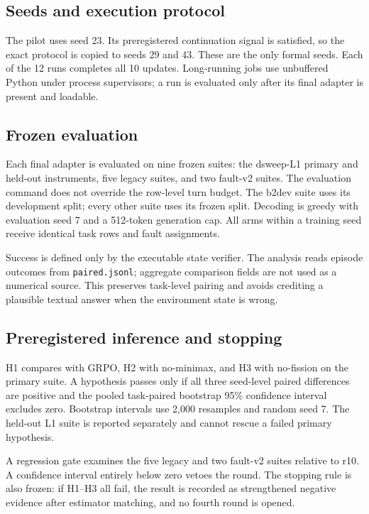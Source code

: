 \subsection{Seeds and execution protocol}

The pilot uses seed 23.  Its preregistered continuation signal is satisfied,
so the exact protocol is copied to seeds 29 and 43.  These are the only formal
seeds.  Each of the 12 runs completes all 10 updates.  Long-running jobs use
unbuffered Python under process supervisors; a run is evaluated only after
its final adapter is present and loadable.

\subsection{Frozen evaluation}

Each final adapter is evaluated on nine frozen suites: the dsweep-L1 primary
and held-out instruments, five legacy suites, and two fault-v2 suites.  The
evaluation command does not override the row-level turn budget.  The b2dev
suite uses its development split; every other suite uses its frozen split.
Decoding is greedy with evaluation seed 7 and a 512-token generation cap.
All arms within a training seed receive identical task rows and fault
assignments.

Success is defined only by the executable state verifier.  The analysis reads
episode outcomes from \texttt{paired.jsonl}; aggregate comparison fields are
not used as a numerical source.  This preserves task-level pairing and avoids
crediting a plausible textual answer when the environment state is wrong.

\subsection{Preregistered inference and stopping}

H1 compares \method{} with GRPO, H2 with no-minimax, and H3 with no-fission on
the primary suite.  A hypothesis passes only if all three seed-level paired
differences are positive and the pooled task-paired bootstrap 95\% confidence
interval excludes zero.  Bootstrap intervals use 2,000 resamples and random
seed 7.  The held-out L1 suite is reported separately and cannot rescue a
failed primary hypothesis.

A regression gate examines the five legacy and two fault-v2 suites relative
to r10.  A confidence interval entirely below zero vetoes the round.  The
stopping rule is also frozen: if H1--H3 all fail, the result is recorded as
strengthened negative evidence after estimator matching, and no fourth round
is opened.
